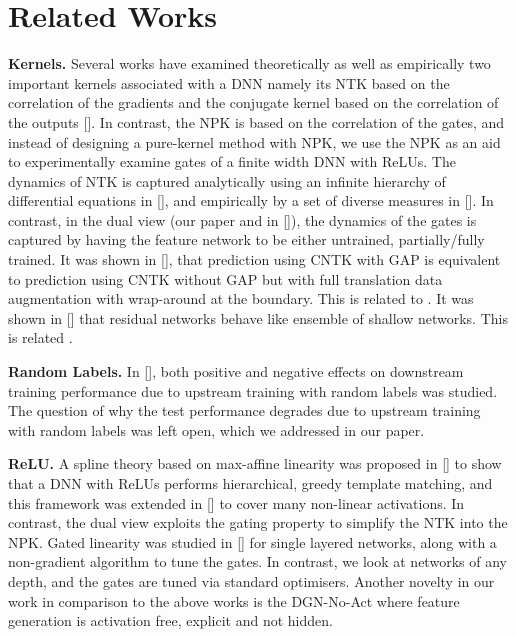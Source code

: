 \section{Related Works}
\textbf{Kernels.} Several works have examined theoretically as well as empirically two important kernels associated with a DNN namely its NTK based on the correlation of the gradients and the conjugate kernel based on the correlation of the outputs []. In contrast, the NPK is based on the correlation of the gates, and instead of designing a pure-kernel method with NPK, we use the NPK as an aid to experimentally examine gates of a finite width DNN with ReLUs.  The dynamics of NTK is captured analytically using an infinite hierarchy of differential equations in [], and empirically by a set of diverse measures in  []. In contrast, in the dual view (our paper and in []), the dynamics of the gates is captured by having the feature network to be either untrained, partially/fully trained. It was shown in [], that  prediction using CNTK with GAP is equivalent to prediction using CNTK without GAP but with full translation data augmentation with wrap-around at the boundary. This is related to . It was shown in [] that residual networks behave like ensemble of shallow networks. This is related .

\textbf{Random Labels.} In [], both positive and negative effects on downstream training performance due to upstream training with random labels was studied. The question of why the test performance degrades due to upstream training with random labels was left open, which we addressed in our paper. 

\textbf{ReLU.}  A spline theory based on max-affine linearity was proposed in [] to show that a DNN with ReLUs performs hierarchical, greedy template matching, and this framework was extended in [] to cover many non-linear activations. In contrast, the dual view exploits the gating property to simplify the NTK into the NPK. Gated linearity was studied in [] for single layered networks, along with a non-gradient algorithm to tune the gates. In contrast, we look at networks of any depth, and the gates are tuned via standard optimisers. Another novelty in our work in comparison to the above works is the DGN-No-Act where feature generation is activation free, explicit and not hidden.


